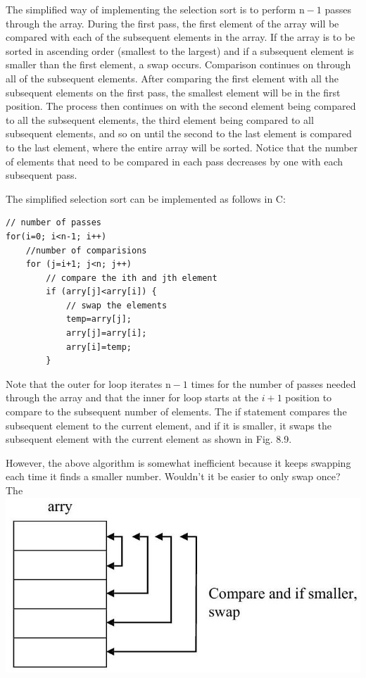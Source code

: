 \documentclass[10pt]{article}
\begin{document}
The simplified way of implementing the selection sort is to perform $\mathrm{n}-1$ passes through the array. During the first pass, the first element of the array will be compared with each of the subsequent elements in the array. If the array is to be\\
sorted in ascending order (smallest to the largest) and if a subsequent element is smaller than the first element, a swap occurs. Comparison continues on through all of the subsequent elements. After comparing the first element with all the subsequent elements on the first pass, the smallest element will be in the first position. The process then continues on with the second element being compared to all the subsequent elements, the third element being compared to all subsequent elements, and so on until the second to the last element is compared to the last element, where the entire array will be sorted. Notice that the number of elements that need to be compared in each pass decreases by one with each subsequent pass.

The simplified selection sort can be implemented as follows in C:

\begin{verbatim}
// number of passes
for(i=0; i<n-1; i++)
    //number of comparisions
    for (j=i+1; j<n; j++)
        // compare the ith and jth element
        if (arry[j]<arry[i]) {
            // swap the elements
            temp=arry[j];
            arry[j]=arry[i];
            arry[i]=temp;
        }
\end{verbatim}

Note that the outer for loop iterates $\mathrm{n}-1$ times for the number of passes needed through the array and that the inner for loop starts at the $i+1$ position to compare to the subsequent number of elements. The if statement compares the subsequent element to the current element, and if it is smaller, it swaps the subsequent element with the current element as shown in Fig. 8.9.

However, the above algorithm is somewhat inefficient because it keeps swapping each time it finds a smaller number. Wouldn't it be easier to only swap once? The\\
\includegraphics[max width=\textwidth, center]{2025_03_24_ebe50cc223a6fbc49eecg-193}
\end{document}
